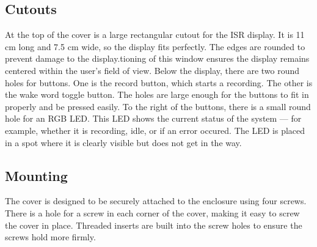 \subsection{Cutouts}
At the top of the cover is a large rectangular cutout for the ISR display. It is 11 cm long and 7.5 cm wide, so the display fits perfectly. The edges are rounded to prevent damage to the display.tioning of this window ensures the display remains centered within the user's field of view.
Below the display, there are two round holes for buttons.
One is the record button, which starts a recording. The other is the wake word toggle button. The holes are large enough for the buttons to fit in properly and be pressed easily.
To the right of the buttons, there is a small round hole for an RGB LED. This LED shows the current status of the system --- for example, whether it is recording, idle, or if an error occured.
The LED is placed in a spot where it is clearly visible but does not get in the way.

\subsection{Mounting}
The cover is designed to be securely attached to the enclosure using four screws. There is a hole for a screw in each corner of the cover, making it easy to screw the cover in place. Threaded inserts are built into the screw holes to ensure the screws hold more firmly.

